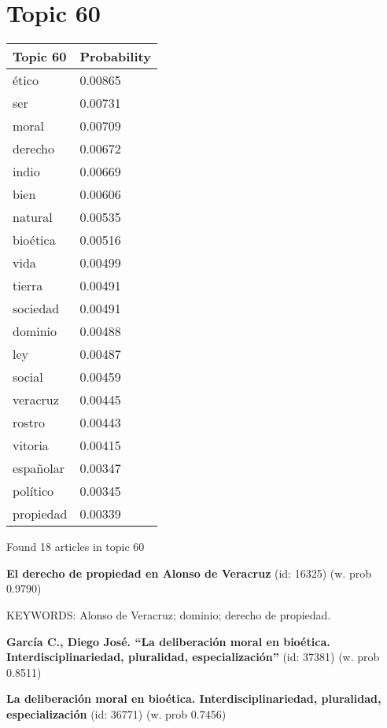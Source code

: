 \documentclass{article}
\begin{document}
\centering
\thispagestyle{empty}
\section*{Topic 60}\vfill
\begin{tabular}{ll}
\toprule
  Topic 60 & Probability \\
\midrule
     ético &     0.00865 \\
       ser &     0.00731 \\
     moral &     0.00709 \\
   derecho &     0.00672 \\
     indio &     0.00669 \\
      bien &     0.00606 \\
   natural &     0.00535 \\
  bioética &     0.00516 \\
      vida &     0.00499 \\
    tierra &     0.00491 \\
  sociedad &     0.00491 \\
   dominio &     0.00488 \\
       ley &     0.00487 \\
    social &     0.00459 \\
  veracruz &     0.00445 \\
    rostro &     0.00443 \\
   vitoria &     0.00415 \\
 españolar &     0.00347 \\
  político &     0.00345 \\
 propiedad &     0.00339 \\
\bottomrule
\end{tabular}

\vfill
Found 18 articles in topic 60
\vfill

\textbf{El derecho de propiedad en Alonso de Veracruz} (id: 16325)
 (w. prob 0.9790)


KEYWORDS:
Alonso de Veracruz; dominio; derecho de propiedad.
\vfill

\textbf{García C., Diego José. “La deliberación moral en bioética. Interdisciplinariedad, pluralidad, especialización”} (id: 37381)
 (w. prob 0.8511)
\vfill

\textbf{La deliberación moral en bioética. Interdisciplinariedad, pluralidad, especialización} (id: 36771)
 (w. prob 0.7456)

\vfill
\newpage


\centering
\thispagestyle{empty}
\end{document}
